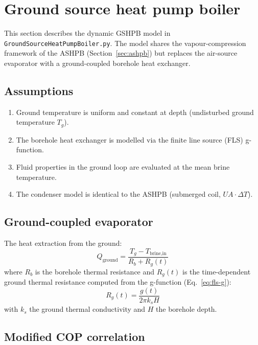 \section{Ground source heat pump boiler}
\label{sec:gshpb}

This section describes the dynamic GSHPB model in \texttt{GroundSourceHeatPumpBoiler.py}. The model shares the vapour-compression framework of the ASHPB (Section~\ref{sec:ashpb}) but replaces the air-source evaporator with a ground-coupled borehole heat exchanger.

\subsection{Assumptions}
\begin{enumerate}
  \item Ground temperature is uniform and constant at depth (undisturbed ground temperature $T_g$).
  \item The borehole heat exchanger is modelled via the finite line source (FLS) g-function.
  \item Fluid properties in the ground loop are evaluated at the mean brine temperature.
  \item The condenser model is identical to the ASHPB (submerged coil, $UA\cdot\Delta T$).
\end{enumerate}

\subsection{Ground-coupled evaporator}

The heat extraction from the ground:
\begin{equation}\label{eq:gshp-Qground}
  Q_\text{ground} = \frac{T_g - T_\text{brine,in}}{R_b + R_g(t)}
\end{equation}
where $R_b$ is the borehole thermal resistance and $R_g(t)$ is the time-dependent ground thermal resistance computed from the g-function (Eq.~\ref{eq:fls-g}):
\begin{equation}\label{eq:gshp-Rg}
  R_g(t) = \frac{g(t)}{2\pi k_s H}
\end{equation}
with $k_s$ the ground thermal conductivity and $H$ the borehole depth.

\subsection{Modified COP correlation}

